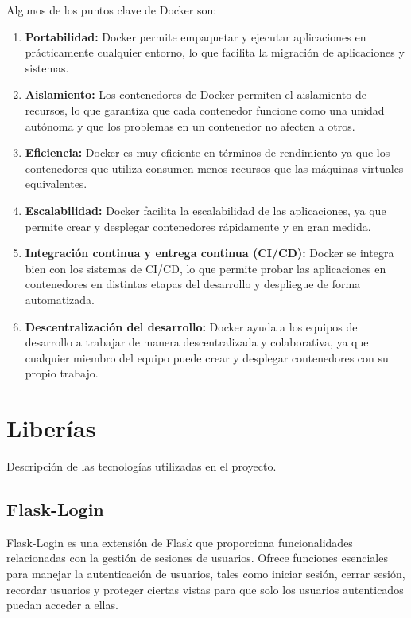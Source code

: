 \documentclass[a4paper, 12pt]{book}
\begin{document}
Algunos de los puntos clave de Docker son:

\begin{enumerate}
  \item \textbf{Portabilidad:} Docker permite empaquetar y ejecutar aplicaciones en prácticamente cualquier entorno, lo que facilita la migración de aplicaciones y sistemas.
  \item \textbf{Aislamiento:} Los contenedores de Docker permiten el aislamiento de recursos, lo que garantiza que cada contenedor funcione como una unidad autónoma y que los problemas en un contenedor no afecten a otros.
  \item \textbf{Eficiencia:} Docker es muy eficiente en términos de rendimiento ya que los contenedores que utiliza consumen menos recursos que las máquinas virtuales equivalentes.
  \item \textbf{Escalabilidad:} Docker facilita la escalabilidad de las aplicaciones, ya que permite crear y desplegar contenedores rápidamente y en gran medida.
  \item \textbf{Integración continua y entrega continua (CI/CD):} Docker se integra bien con los sistemas de CI/CD, lo que permite probar las aplicaciones en contenedores en distintas etapas del desarrollo y despliegue de forma automatizada.
  \item \textbf{Descentralización del desarrollo:} Docker ayuda a los equipos de desarrollo a trabajar de manera descentralizada y colaborativa, ya que cualquier miembro del equipo puede crear y desplegar contenedores con su propio trabajo. 
\end{enumerate}

\section{Liberías}
\label{sec:Librerias}

Descripción de las tecnologías utilizadas en el proyecto. 

\subsection{Flask-Login}
\label{subsec:flasklogin} Flask-Login es una extensión de Flask que proporciona funcionalidades relacionadas con la gestión de sesiones de usuarios. 
Ofrece funciones esenciales para manejar la autenticación de usuarios, tales como iniciar sesión, cerrar sesión, recordar usuarios y proteger ciertas 
vistas para que solo los usuarios autenticados puedan acceder a ellas.
\end{document}
